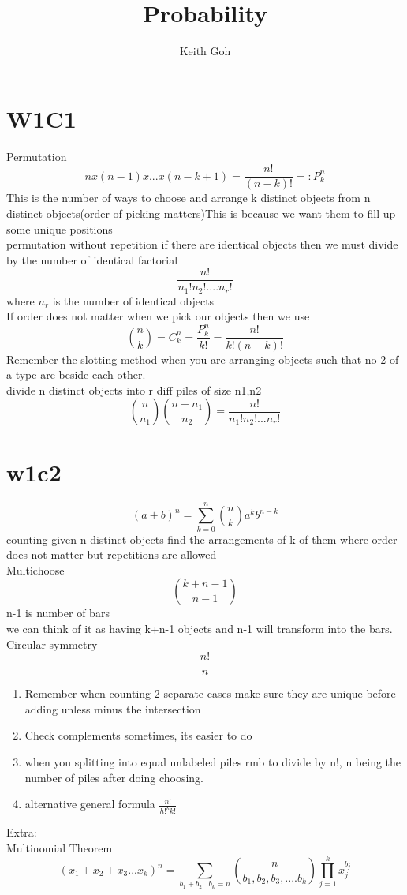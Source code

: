 \documentclass{article}
\title{Probability}
\author{Keith Goh}
\begin{document}
\maketitle

\section{W1C1}
Permutation
$$
nx(n-1)x...x(n-k+1)=\frac{n!}{(n-k)!}=:P^n_k
$$
This is the number of ways to choose and arrange k distinct objects from n distinct objects(order of picking matters)This is because we want them to fill up some unique positions\\
permutation without repetition if there are identical objects then we must divide by the number of  identical factorial
$$
\frac{n!}{n_1!n_2!....n_r!}
$$
where $n_r$  is the number of identical objects \\
If order does not matter when we pick our objects then we use
$$
{n \choose k} = C^n_k=\frac{P^n_k}{k!}=\frac{n!}{k!(n-k)!}
$$
Remember the slotting method when you are arranging objects such that no 2 of a type are beside each other.\\
divide n distinct objects into r diff piles of size n1,n2
$$
{n \choose n_1}{n-n_1 \choose n_2}=\frac{n!}{n_1!n_2!...n_r!}
$$
\section{w1c2}
$$
(a+b)^n=\sum_{k=0}^n{n \choose k}a^kb^{n-k}
$$
counting given n distinct objects find the arrangements of k of them where order does not matter but repetitions are allowed\\
Multichoose
$$
{k+n-1 \choose n-1}
$$
n-1 is number of bars\\
we can think of it as having k+n-1 objects and n-1 will transform into the bars.\\
Circular symmetry
$$
\frac{n!}{n}
$$
\begin{enumerate}
  \item Remember when counting 2 separate cases make sure they are unique before adding unless minus the intersection
  \item Check complements sometimes, its easier to do
  \item when you splitting into equal unlabeled piles rmb to divide by n!, n being the number of piles after doing choosing.
  \item alternative general formula $\frac{n!}{h!^kk!}$
\end{enumerate}
Extra:\\
Multinomial Theorem
$$
(x_1+x_2+x_3...x_k)^n=\sum_{b_1+b_2...b_k=n}{n \choose b_1,b_2,b_3,....b_k}\prod_{j=1}^kx^{b_j}_j
$$
\end{document}
